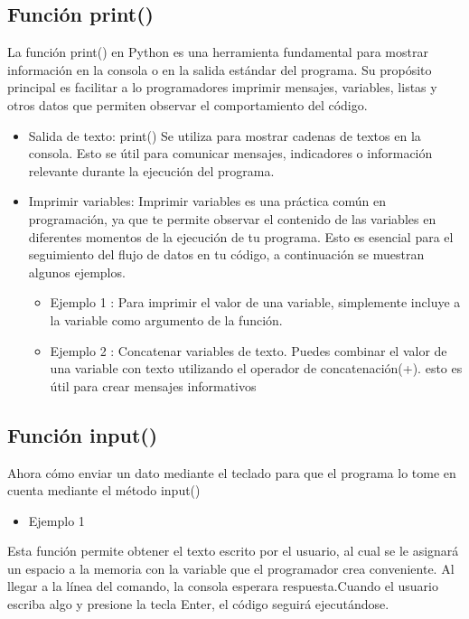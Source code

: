 \subsection{Función print()}
La función print() en Python es una herramienta fundamental para mostrar información en la consola o en la salida estándar del programa. Su propósito principal es facilitar a lo programadores imprimir mensajes, variables, listas y otros datos que permiten observar el comportamiento del código.

\begin{itemize}
    \item Salida de texto: print() Se utiliza para mostrar cadenas de textos en la consola. Esto se útil para comunicar mensajes, indicadores o información relevante durante la ejecución del programa.
    \item Imprimir variables: Imprimir variables es una práctica común en programación, ya que te permite observar el contenido de las variables en diferentes momentos de la ejecución de tu programa. Esto es esencial para el seguimiento del flujo de datos en tu código, a continuación se muestran algunos ejemplos.
\begin{itemize}
    \item Ejemplo 1 : Para imprimir el valor de una variable, simplemente incluye a la variable como argumento de la función.
    \item Ejemplo 2 : Concatenar variables de texto. Puedes combinar el valor de una variable con texto utilizando el operador de concatenación(+). esto es útil para crear mensajes informativos
\end{itemize}   
\end{itemize}

\subsection{Función input()}
Ahora cómo enviar un dato mediante el teclado para que el programa lo tome en cuenta mediante el método input()

\begin{itemize}
    \item Ejemplo 1
\end{itemize}

Esta función permite obtener el texto escrito por el usuario, al cual se le asignará un espacio a la memoria con la variable que el programador crea conveniente. Al llegar a la línea del comando, la consola esperara respuesta.Cuando el usuario escriba algo y presione la tecla Enter, el código seguirá ejecutándose.\\

